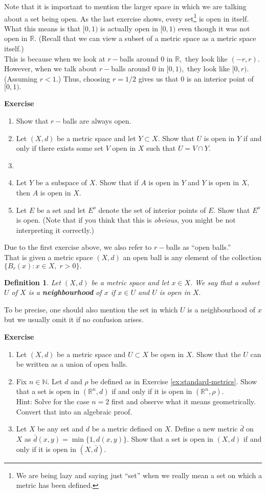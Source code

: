 \documentclass{article}
\newtheorem{defn}{Definition}
\newcounter{exercise}
\newcommand{\exercise}{\refstepcounter{exercise}\par\medskip
   {\textbf{Exercise \theexercise }} \rmfamily}
\begin{document}
	Note that it is important to mention the larger space in which we are talking about a set being open. As the last exercise shows, every set\footnote{We are being lazy and saying just ``set'' when we really mean a set on which a metric has been defined.} is open in itself. What this means is that $[0, 1)$ is actually open in $[0, 1)$ even though it was not open in $\mathbb{R}.$ (Recall that we can view a subset of a metric space as a metric space itself.)\\
	This is because when we look at $r-$balls around $0$ in $\mathbb{R},$ they look like $(-r, r).$ However, when we talk about $r-$balls around $0$ in $[0, 1),$ they look like $[0, r).$ (Assuming $r < 1.$) Thus, choosing $r = 1/2$ gives us that $0$ is an interior point of $[0, 1).$\\
	\exercise
	\begin{enumerate}[nosep] 
		\item Show that $r-$balls are always open.
		\item Let $(X, d)$ be a metric space and let $Y \subset X.$ Show that $U$ is open in $Y$ if and only if there exists some set $V$ open in $X$ such that $U = V \cap Y.$
		\item 
		\item Let $Y$ be a subspace of $X.$ Show that if $A$ is open in $Y$ and $Y$ is open in $X,$ then $A$ is open in $X.$
		\item Let $E$ be a set and let $E^o$ denote the set of interior points of $E.$ Show that $E^o$ is open. (Note that if you think that this is \emph{obvious,} you might be not interpreting it correctly.)
	\end{enumerate}
	Due to the first exercise above, we also refer to $r-$balls as ``open balls.''\\
	That is given a metric space $(X, d)$ an open ball is any element of the collection $\{B_r(x) : x \in X,\; r > 0\}.$
	\begin{defn}
		Let $(X, d)$ be a metric space and let $x \in X.$ We say that a subset $U$ of $X$ is a \textbf{neighbourhood} of $x$ if $x \in U$ and $U$ is open in $X.$
	\end{defn}
	To be precise, one should also mention the set in which $U$ is a neighbourhood of $x$ but we usually omit it if no confusion arises. 
	\exercise
	\begin{enumerate}[nosep] 
		\item Let $(X, d)$ be a metric space and $U \subset X$ be open in $X.$ Show that the $U$ can be written as a union of open balls.
		\item Fix $n \in \mathbb{N}.$ Let $d$ and $\rho$ be defined as in Exercise \ref{ex:standard-metrics}. Show that a set is open in $(\mathbb{R}^n, d)$ if and only if it is open in $(\mathbb{R}^n, \rho).$\\
		Hint: Solve for the case $n = 2$ first and observe what it means geometrically. Convert that into an algebraic proof.
		\item Let $X$ be any set and $d$ be a metric defined on $X.$ Define a new metric $\bar{d}$ on $X$ as $\bar{d}(x, y) = \min\{1, d(x, y)\}.$ Show that a set is open in $(X, d)$ if and only if it is open in $(X, \bar{d}).$
	\end{enumerate}
\end{document}
